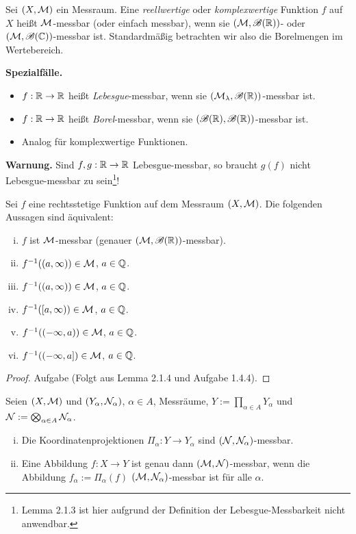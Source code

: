 \documentclass[
 a4paper,
 12pt,
 parskip=half
 ]{scrreprt}
\theoremstyle{plain}
\theoremstyle{definition}
\numberwithin{equation}{section}
\begin{document}
Sei $(X,\mathcal{M})$ ein Messraum. Eine \emph{reellwertige} oder \emph{komplexwertige} Funktion $f$ auf $X$ heißt $\mathcal{M}$-messbar (oder einfach messbar), wenn sie $(\mathcal{M},\mathscr{B}(\mathbb{R}))$- oder $(\mathcal{M},\mathscr{B}(\mathbb{C}))$-messbar ist. Standardmäßig betrachten wir also die Borelmengen im Wertebereich.

\textbf{Spezialfälle.}
\begin{itemize}
 \item $f: \mathbb{R} \to \mathbb{R}$ heißt \emph{Lebesgue}-messbar, wenn sie $(\mathcal{M}_\lambda, \mathscr{B}(\mathbb{R}))$-messbar ist.
 \item $f: \mathbb{R} \to \mathbb{R}$ heißt \emph{Borel}-messbar, wenn sie $(\mathscr{B}(\mathbb{R}), \mathscr{B}(\mathbb{R}))$-messbar ist.
 \item Analog für komplexwertige Funktionen.
\end{itemize}

\textbf{Warnung.}
Sind $f,g: \mathbb{R} \to \mathbb{R}$ Lebesgue-messbar, so braucht $g(f)$ nicht Lebesgue-messbar zu sein\footnote{Lemma 2.1.3 ist hier aufgrund der Definition der Lebesgue-Messbarkeit nicht anwendbar.}!

\begin{lem}
 Sei $f$ eine rechtsstetige Funktion auf dem Messraum $(X,\mathcal{M})$. Die folgenden Aussagen sind äquivalent:
 \begin{enumerate}[(i)]
  \item $f$ ist $\mathcal{M}$-messbar (genauer $(\mathcal{M},\mathscr{B}(\mathbb{R}))$-messbar).
  \item $f^{-1}((a,\infty)) \in \mathcal{M}$, $a \in \mathbb{Q}$.
  \item $f^{-1}((a,\infty)) \in \mathcal{M}$, $a \in \mathbb{Q}$.
  \item $f^{-1}([a,\infty)) \in \mathcal{M}$, $a \in \mathbb{Q}$.
  \item $f^{-1}((-\infty,a)) \in \mathcal{M}$, $a \in \mathbb{Q}$.
  \item $f^{-1}((-\infty,a]) \in \mathcal{M}$, $a \in \mathbb{Q}$.
 \end{enumerate}
\end{lem}

\begin{proof}
 Aufgabe (Folgt aus Lemma 2.1.4 und Aufgabe 1.4.4).
\end{proof}

\clearpage

\begin{lem}
 Seien $(X,\mathcal{M})$ und $(Y_\alpha, \mathcal{N}_\alpha)$, $\alpha \in A$, Messräume, $Y := \prod_{\alpha \in A} Y_\alpha$ und $\mathcal{N} := \bigotimes_{\alpha \in A} \mathcal{N}_\alpha$.
 \begin{enumerate}[(i)]
  \item Die Koordinatenprojektionen $\Pi_\alpha: Y \to Y_\alpha$ sind $(\mathcal{N},\mathcal{N}_\alpha)$-messbar.
  \item Eine Abbildung $f: X \to Y$ ist genau dann $(\mathcal{M},\mathcal{N})$-messbar, wenn die Abbildung $f_\alpha := \Pi_\alpha(f)$ $(\mathcal{M},\mathcal{N}_\alpha)$-messbar ist für alle $\alpha$.
 \end{enumerate}
\end{lem}
\end{document}
